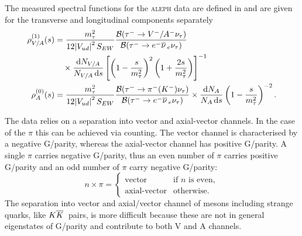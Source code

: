 \documentclass[../../index.tex]{subfiles}
\begin{document}
The measured spectral functions for the \textsc{aleph} data are defined in
\cite{Davier2007} and are given for the transverse and longitudinal components
separately
\begin{equation}
  \begin{split}
    \rho^{(1)}_{V/A}(s) &= \frac{m_\tau^2}{12 \abs{V_{ud}}^2S_{EW}} \frac{\mathcal{B}(\tau^- \to V^-/A^- \nu_\tau)}{\mathcal{B}(\tau^- \to e^- \anti{\nu}_e \nu_\tau)} \\
    &\quad\times \frac{\dif N_{V/A}}{N_{V/A}\dif s} \left[ \left( 1 - \frac{s}{m_\tau^2} \right)^2 \left( 1 + \frac{2s}{m_\tau^2} \right) \right]^{-1} \\
    \rho^{(0)}_{A}(s) &= \frac{m_\tau^2}{12 \abs{V_{ud}}^2 S_{EW}}
    \frac{\mathcal{B}(\tau^- \to \pi^-(K^-) \nu_\tau)}{\mathcal{B}(\tau^- \to
      e^- \anti{\nu}_e \nu_\tau)} \times \frac{\dif N_A}{N_A \dif s} \left( 1 -
      \frac{s}{m_\tau^2} \right)^{-2}.
  \end{split}
\end{equation}

The data relies on a separation into vector and axial-vector channels. In the
case of the \(\pi\) this can be achieved via counting. The vector channel is
characterised by a negative G\-/parity, whereas the axial-vector channel has
positive G\-/parity. A single \(\pi\) carries negative G\-/parity, thus an even
number of \(\pi\) carries positive G\-/parity and an odd number of \(\pi\) carry
negative G\-/parity:
\begin{equation}
  n \times \pi = \begin{cases} \mbox{vector} & \mbox{if } n \text{ is even}, \\ \mbox{axial-vector} & \mbox{otherwise.} \end{cases}
\end{equation}
The separation into vector and axial\-/vector channel of mesons including
strange quarks, like \(K\overline{K}\,\) pairs, is more difficult because these are
not in general eigenstates of G\-/parity and contribute to both \textsc{V} and
\textsc{A} channels.
\end{document}
